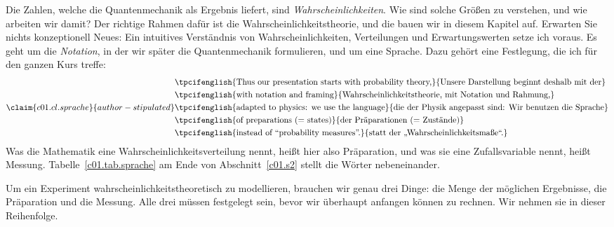 Die Zahlen, welche die Quantenmechanik als Ergebnis liefert, sind \emph{Wahrscheinlichkeiten}.
Wie sind solche Größen zu verstehen, und wie arbeiten wir damit? Der richtige Rahmen dafür ist
die Wahrscheinlichkeitstheorie, und die bauen wir in diesem Kapitel auf. Erwarten Sie nichts
konzeptionell Neues: Ein intuitives Verständnis von Wahrscheinlichkeiten, Verteilungen und
Erwartungswerten setze ich voraus. Es geht um die \emph{Notation}, in der wir später die
Quantenmechanik formulieren, und um eine Sprache. Dazu gehört eine Festlegung, die ich für
den ganzen Kurs treffe:
\begin{equation}\label{c01.eq.sprache}\claim{c01.cl.sprache}{author-stipulated}
  \begin{aligned}
    &\text{\tpcifenglish{Thus our presentation starts with probability theory,}{Unsere Darstellung beginnt deshalb mit der}} \\
    &\text{\tpcifenglish{with notation and framing}{Wahrscheinlichkeitstheorie, mit Notation und Rahmung,}} \\
    &\text{\tpcifenglish{adapted to physics: we use the language}{die der Physik angepasst sind: Wir benutzen die Sprache}} \\
    &\text{\tpcifenglish{of preparations (= states)}{der Präparationen (= Zustände)}} \\
    &\text{\tpcifenglish{instead of “probability measures”.}{statt der „Wahrscheinlichkeitsmaße“.}}
  \end{aligned}
\end{equation}
Was die Mathematik eine Wahrscheinlichkeitsverteilung nennt, heißt hier also Präparation,
und was sie eine Zufallsvariable nennt, heißt Messung. Tabelle~\ref{c01.tab.sprache} am Ende
von Abschnitt~\ref{c01.s2} stellt die Wörter nebeneinander.

Um ein Experiment wahrscheinlichkeitstheoretisch zu modellieren, brauchen wir genau drei
Dinge: die Menge der möglichen Ergebnisse, die Präparation und die Messung. Alle drei müssen
festgelegt sein, bevor wir überhaupt anfangen können zu rechnen. Wir nehmen sie in dieser
Reihenfolge.

